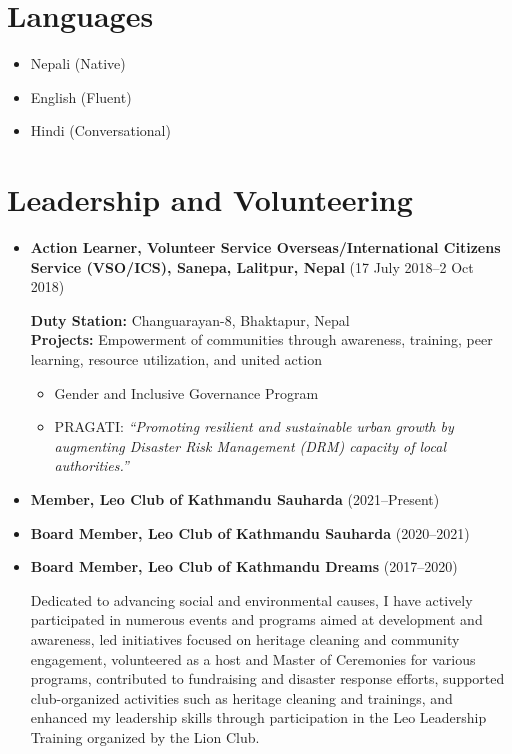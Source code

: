 \documentclass[a4paper,11.5pt]{article}
\begin{document}
\section{Languages}
\begin{multicols}{3}
\begin{itemize}
    \item Nepali (Native)
    \item English (Fluent)
    \item Hindi (Conversational)
\end{itemize}
\end{multicols}

\section{Leadership and Volunteering}

\begin{itemize}
    \item \textbf{Action Learner, Volunteer Service Overseas/International Citizens Service (VSO/ICS), Sanepa, Lalitpur, Nepal} (17 July 2018--2 Oct 2018)

    \textbf{Duty Station:} Changuarayan-8, Bhaktapur, Nepal\\
    \textbf{Projects:} Empowerment of communities through awareness, training, peer learning, resource utilization, and united action
    \begin{itemize}
        \item Gender and Inclusive Governance Program
        \item PRAGATI: \textit{“Promoting resilient and sustainable urban growth by augmenting Disaster Risk
        Management (DRM) capacity of local authorities.”}
    \end{itemize}
    \item \textbf{Member, Leo Club of Kathmandu Sauharda} (2021--Present)
    \item \textbf{Board Member, Leo Club of Kathmandu Sauharda} (2020--2021)
    \item \textbf{Board Member, Leo Club of Kathmandu Dreams} (2017--2020)
    
    Dedicated to advancing social and environmental causes, I have actively participated in numerous events and programs aimed at development and awareness, led initiatives focused on heritage cleaning and community engagement, volunteered as a host and Master of Ceremonies for various programs, contributed to fundraising and disaster response efforts, supported club-organized activities such as heritage cleaning and trainings, and enhanced my leadership skills through participation in the Leo Leadership Training organized by the Lion Club.

\end{itemize}
\end{document}
